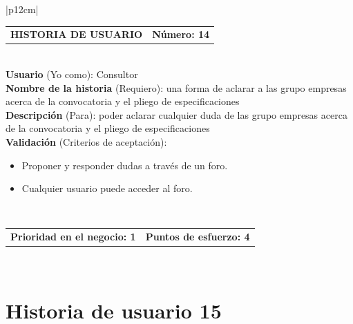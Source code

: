 \documentclass[11pt,letterpaper]{report}
\begin{document}
	\begin{center}	
		\begin{tabular}{|p{12cm}|}
			\hline
			\begin{tabular}{c|c}
				\textbf{HISTORIA DE USUARIO} & \textbf{Número: 14} \\
			\end{tabular} \\ \hline
			\textbf{Usuario} (Yo como): Consultor \\ \hline
			\textbf{Nombre de la historia} (Requiero): una forma de aclarar a las grupo empresas acerca de la convocatoria y el pliego de especificaciones \\ \hline
			\textbf{Descripción} (Para): poder aclarar cualquier duda de las grupo empresas acerca de la convocatoria y el pliego de especificaciones \\ \hline
			\textbf{Validación} (Criterios de aceptación): \\
			\begin{minipage}{12cm}
				\begin{itemize}
					\item Proponer y responder dudas a través de un foro.
					\item Cualquier usuario puede acceder al foro.
				\end{itemize}
			\end{minipage} \\ \hline
			\begin{tabular}{c|c}
				\textbf{Prioridad en el negocio: 1} & \textbf{Puntos de esfuerzo: 4} \\
			\end{tabular} \\ \hline
		\end{tabular}
	\end{center}
	
	\section{Historia de usuario 15}
	
\end{document}
